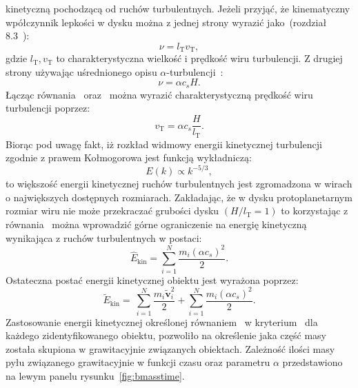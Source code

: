 kinetyczną pochodzącą od ruchów turbulentnych.  Jeżeli przyjąć, że kinematyczny
wpółczynnik lepkości w dysku można z jednej strony wyrazić jako~(rozdział
8.3~\cite{C98}):
%
\begin{equation}
   \nu = l_{\textrm{T}} v_{\textrm{T}},
   \label{eq:nu1}
\end{equation}
%
gdzie $l_{\textrm{T}}, v_{\textrm{T}}$ to charakterystyczna wielkość i prędkość
wiru turbulencji. Z drugiej strony używając uśrednionego opisu
$\alpha$-turbulencji~\cite{SS73}:
%
\begin{equation}
   \nu = \alpha c_s H.
   \label{eq:nu2}
\end{equation}
%
Łącząc równania~ oraz~ można wyrazić charakterystyczną
prędkość wiru turbulencji poprzez:
%
\begin{equation}
   v_{\textrm{T}} = \alpha c_s \frac{H}{l_{\textrm{T}}}.
   \label{eq:velt}
\end{equation}
%
Biorąc pod uwagę fakt, iż rozkład widmowy energii kinetycznej turbulencji
zgodnie z prawem Kołmogorowa jest funkcją wykładniczą:
\begin{equation}
   E(k) \propto k^{-5/3},
\end{equation}
to większość energii kinetycznej ruchów turbulentnych jest zgromadzona w wirach
o największych dostępnych rozmiarach. Zakładając, że w dysku protoplanetarnym
rozmiar wiru nie może przekraczać grubości dysku $(H / l_{\textrm{T}} = 1)$ to
korzystając z równania~ można wprowadzić górne ograniczenie na
energię kinetyczną wynikająca z ruchów turbulentnych w postaci:
\begin{equation}
   \hat{E}_{\textrm{kin}} = \sum\limits_{i=1}^N \frac{m_i \left(\alpha
   c_s\right)^2}{2}.
   \label{eq:ekinturb}
\end{equation}
%
Ostateczna postać energii kinetycznej obiektu jest wyrażona poprzez:
%
\begin{equation}
   \label{eq:ekin}
   \tilde{E}_{\textrm{kin}} = \
   \sum\limits_{i=1}^N \frac{m_i\tilde{\mathbf{v}}_i^2}{2}
   + \sum\limits_{i=1}^N \frac{m_i \left(\alpha c_s\right)^2}{2}.
\end{equation}
%
Zastosowanie energii kinetycznej określonej równaniem~ w
kryterium~\mref{eq:bcrit} dla każdego zidentyfikowanego obiektu, pozwoliło na
określenie jaka część masy została skupiona w grawitacyjnie związanych
obiektach. Zależność ilości masy pyłu związanego grawitacyjnie w funkcji czasu
oraz parametru $\alpha$ przedstawiono na lewym panelu rysunku~\ref{fig:bmasstime}.
